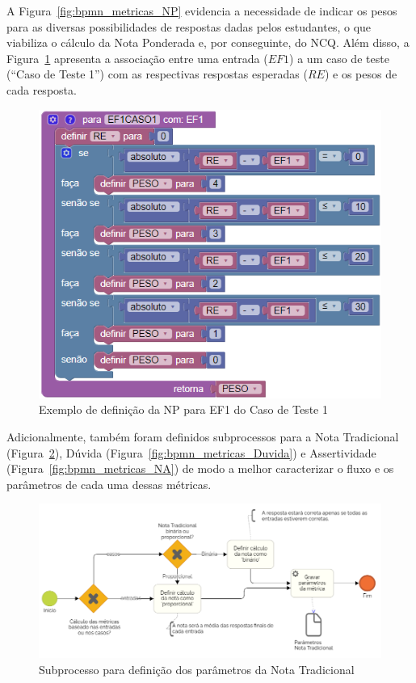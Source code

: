 A Figura~\ref{fig:bpmn_metricas_NP} evidencia a necessidade de indicar os pesos para as diversas possibilidades de respostas dadas pelos estudantes, o que viabiliza o cálculo da Nota Ponderada %
e, por conseguinte, do NCQ. Além disso, a Figura~\ref{fig:CASO1NPEF1} apresenta a associação entre uma entrada ($EF1$) a um caso de teste (``Caso de Teste 1'') com as respectivas respostas esperadas ($RE$) e os pesos de cada resposta.

\begin{figure}[htb]
	\centering
	\includegraphics[width=0.6\linewidth]{chapters/appendixAnalytics/CASO1NPEF1.png}
	\caption{Exemplo de definição da NP para EF1 do Caso de Teste 1}
	\label{fig:CASO1NPEF1}
\end{figure}

Adicionalmente, também foram definidos subprocessos para a Nota Tradicional (Figura~\ref{fig:bpmn_metricas_NT}), Dúvida (Figura~\ref{fig:bpmn_metricas_Duvida}) e Assertividade (Figura~\ref{fig:bpmn_metricas_NA}) de modo a melhor caracterizar o fluxo e os parâmetros de cada uma dessas métricas.

\begin{figure}[htb]
	\centering
	\includegraphics[width=0.9\linewidth]{chapters/proposedMethod/bpmn_metricas_NT.png}
	\caption{Subprocesso para definição dos parâmetros da Nota Tradicional}
	\label{fig:bpmn_metricas_NT}
\end{figure}

